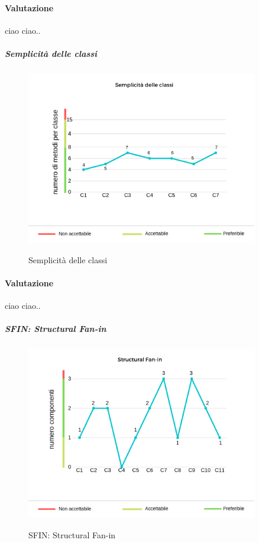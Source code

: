 	\paragraph*{Valutazione} ciao ciao..
	\pagebreak
	\subparagraph{Semplicità delle classi}
	\begin{center}
		\begin{figure}[h] 
			\centering 
			\includegraphics[width=0.90\textwidth]{res/images/new/semplicitaClassi.png}\\
			\caption{Semplicità delle classi}
		\end{figure}
	\end{center}
	\paragraph*{Valutazione} ciao ciao..
	\pagebreak
	\subparagraph{SFIN: Structural Fan-in}
	\begin{center}
		\begin{figure}[h] 
			\centering 
			\includegraphics[width=0.90\textwidth]{res/images/new/sfin.png}\\
			\caption{SFIN: Structural Fan-in}
		\end{figure}
	\end{center}
